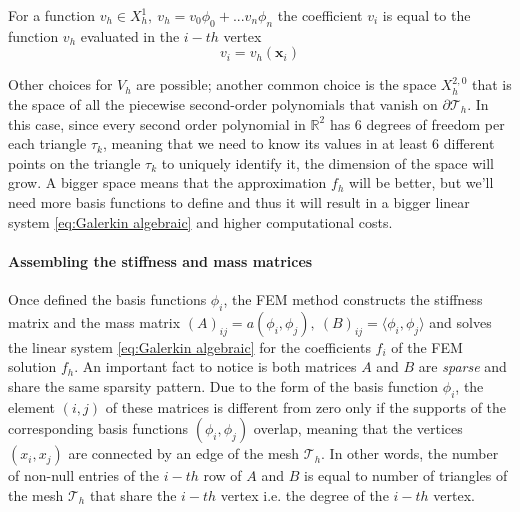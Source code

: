 \vspace{0.5cm}
\begin{remark}
	For a function $v_h \in X^1_h,\ v_h = v_0 \phi_0 +...  v_n \phi_n$ the coefficient $v_i$ is equal to the function $v_h$ evaluated in the $i-th$ vertex 
	\begin{equation}\label{eq:dof and values}
		v_i = v_h(\mathbf x_i)
	\end{equation}
\end{remark}\vspace{0.5cm}

Other choices for $V_h$ are possible; another common choice is the space $X_h^{2,0}$ that is the space of all the piecewise second-order polynomials that vanish on $\partial \mathcal T_h$. In this case, since every second order polynomial in $\mathbb R^2$ has 6 degrees of freedom per each triangle $\tau_k$, meaning that we need to know its values in at least 6 different points on the triangle $\tau_k$ to uniquely identify it, the dimension of the space will grow. A bigger space means that the approximation $f_h$ will be better, but we'll need more basis functions to define and thus it will result in a bigger linear system \ref{eq:Galerkin algebraic} and higher computational costs.

\paragraph{Assembling the stiffness and mass matrices}
Once defined the basis functions $\phi_i$, the FEM method constructs the stiffness matrix and the mass matrix $(A)_{ij} = a(\phi_i, \phi_j),\  (B)_{ij}=\langle\phi_i,\phi_j\rangle$ and solves the linear system \ref{eq:Galerkin algebraic} for the coefficients $f_i$ of the FEM solution $f_h$. An important fact to notice is both matrices $A$ and $B$ are \textit{sparse} and share the same sparsity pattern. Due to the form of the basis function $\phi_i$, the element $(i, j)$ of these matrices is different from zero only if the supports of the corresponding basis functions $(\phi_i, \phi_j)$ overlap, meaning that the vertices $(x_i, x_j)$ are connected by an edge of the mesh $\mathcal T_h$. In other words, the number of non-null entries of the $i-th$ row of $A$ and $B$ is equal to number of triangles of the mesh $\mathcal T_h$ that share the $i-th$ vertex i.e. the degree of the $i-th$ vertex.

